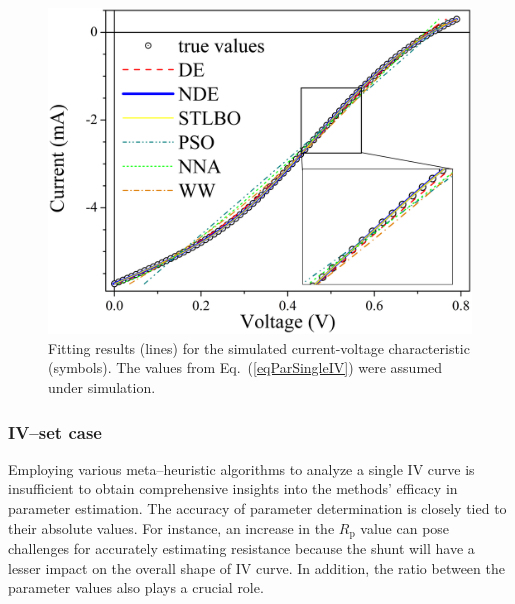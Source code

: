 \documentclass[a4paper,fleqn]{cas-dc}
\begin{document}
\begin{figure}[]
	\centering
		\includegraphics[width=1.0\columnwidth]{IVsimple}
	  \caption{Fitting results (lines) for the simulated current-voltage characteristic (symbols).
             The values from  Eq.~(\ref{eqParSingleIV}) were assumed under simulation.}\label{figSigleIV}
\end{figure}



\subsubsection{IV--set case}\label{SetIV}
Employing various meta--heuristic algorithms to analyze a single IV curve
is insufficient to obtain comprehensive insights into the methods' efficacy in parameter estimation.
The accuracy of parameter determination is closely tied to their absolute values.
For instance, an increase in the $R_\mathrm{p}$ value can pose challenges for accurately estimating resistance
because the shunt will have a lesser impact on the overall shape of IV curve.
In addition, the ratio between the parameter values also plays a crucial role.
\end{document}
